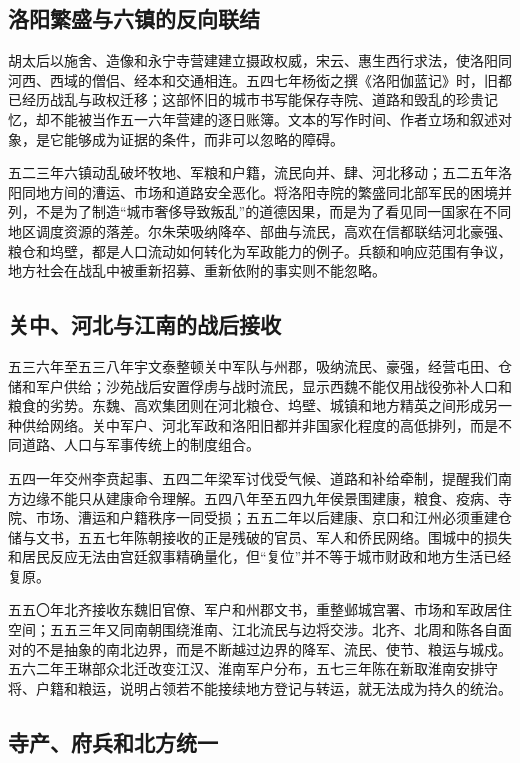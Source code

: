 \subsection{洛阳繁盛与六镇的反向联结}

胡太后以施舍、造像和永宁寺营建建立摄政权威，宋云、惠生西行求法，使洛阳同河西、西域的僧侣、经本和交通相连。五四七年杨衒之撰《洛阳伽蓝记》时，旧都已经历战乱与政权迁移；这部怀旧的城市书写能保存寺院、道路和毁乱的珍贵记忆，却不能被当作五一六年营建的逐日账簿。文本的写作时间、作者立场和叙述对象，是它能够成为证据的条件，而非可以忽略的障碍。

五二三年六镇动乱破坏牧地、军粮和户籍，流民向并、肆、河北移动；五二五年洛阳同地方间的漕运、市场和道路安全恶化。将洛阳寺院的繁盛同北部军民的困境并列，不是为了制造“城市奢侈导致叛乱”的道德因果，而是为了看见同一国家在不同地区调度资源的落差。尔朱荣吸纳降卒、部曲与流民，高欢在信都联结河北豪强、粮仓和坞壁，都是人口流动如何转化为军政能力的例子。兵额和响应范围有争议，地方社会在战乱中被重新招募、重新依附的事实则不能忽略。

\subsection{关中、河北与江南的战后接收}

五三六年至五三八年宇文泰整顿关中军队与州郡，吸纳流民、豪强，经营屯田、仓储和军户供给；沙苑战后安置俘虏与战时流民，显示西魏不能仅用战役弥补人口和粮食的劣势。东魏、高欢集团则在河北粮仓、坞壁、城镇和地方精英之间形成另一种供给网络。关中军户、河北军政和洛阳旧都并非国家化程度的高低排列，而是不同道路、人口与军事传统上的制度组合。

五四一年交州李贲起事、五四二年梁军讨伐受气候、道路和补给牵制，提醒我们南方边缘不能只从建康命令理解。五四八年至五四九年侯景围建康，粮食、疫病、寺院、市场、漕运和户籍秩序一同受损；五五二年以后建康、京口和江州必须重建仓储与文书，五五七年陈朝接收的正是残破的官员、军人和侨民网络。围城中的损失和居民反应无法由宫廷叙事精确量化，但“复位”并不等于城市财政和地方生活已经复原。

五五〇年北齐接收东魏旧官僚、军户和州郡文书，重整邺城宫署、市场和军政居住空间；五五三年又同南朝围绕淮南、江北流民与边将交涉。北齐、北周和陈各自面对的不是抽象的南北边界，而是不断越过边界的降军、流民、使节、粮运与城戍。五六二年王琳部众北迁改变江汉、淮南军户分布，五七三年陈在新取淮南安排守将、户籍和粮运，说明占领若不能接续地方登记与转运，就无法成为持久的统治。

\subsection{寺产、府兵和北方统一}

